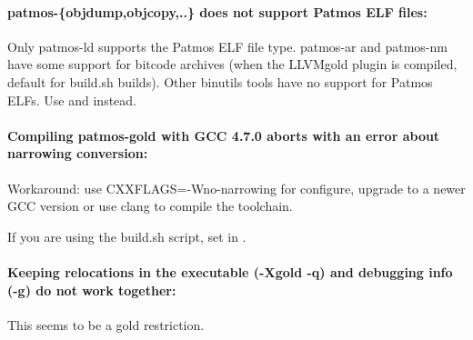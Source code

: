 \paragraph{patmos-\{objdump,objcopy,..\} does not support Patmos ELF files:} Only patmos-ld supports the Patmos
ELF file type. patmos-ar and patmos-nm have some support for bitcode archives (when the LLVMgold plugin is
compiled, default for build.sh builds). Other binutils tools have no support for Patmos ELFs.
Use  and  instead.


\paragraph{Compiling patmos-gold with GCC 4.7.0 aborts with an error about narrowing conversion:}
Workaround: use CXXFLAGS=-Wno-narrowing for configure, upgrade to a newer GCC version or
use clang to compile the toolchain.

If you are using the build.sh script, set  in .


\paragraph{Keeping relocations in the executable (-Xgold -q) and debugging info (-g) do not work together:}
This seems to be a gold restriction.

